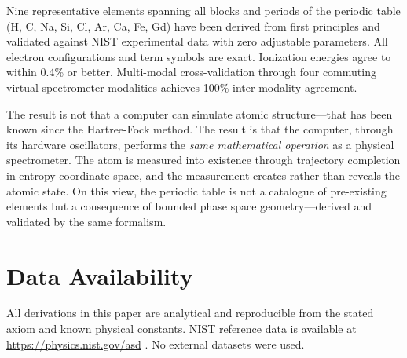 \documentclass[11pt,a4paper]{article}
\theoremstyle{definition}
\theoremstyle{remark}
\begin{document}
Nine representative elements spanning all blocks and periods of the periodic table (H, C, Na, Si, Cl, Ar, Ca, Fe, Gd) have been derived from first principles and validated against NIST experimental data with zero adjustable parameters. All electron configurations and term symbols are exact. Ionization energies agree to within 0.4\% or better. Multi-modal cross-validation through four commuting virtual spectrometer modalities achieves 100\% inter-modality agreement.

The result is not that a computer can simulate atomic structure---that has been known since the Hartree-Fock method. The result is that the computer, through its hardware oscillators, performs the \emph{same mathematical operation} as a physical spectrometer. The atom is measured into existence through trajectory completion in entropy coordinate space, and the measurement creates rather than reveals the atomic state. On this view, the periodic table is not a catalogue of pre-existing elements but a consequence of bounded phase space geometry---derived and validated by the same formalism.

\section*{Data Availability}

All derivations in this paper are analytical and reproducible from the stated axiom and known physical constants. NIST reference data is available at \url{https://physics.nist.gov/asd} \citep{nist_asd}. No external datasets were used.



\end{document}
